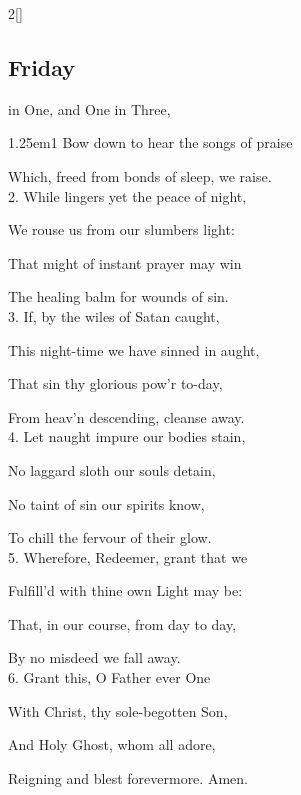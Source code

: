 \begin{paracol}{2}[]
\sloppy

\subsection{Friday}\label{FridayInvitatory}

 in One, and One in Three,


\begin{hangparas}{1.25em}{1}
Bow down to hear the songs of praise

Which, freed from bonds of sleep, we raise.\\

2. While lingers yet the peace of night,

We rouse us from our slumbers light:

That might of instant prayer may win

The healing balm for wounds of sin.\\

3. If, by the wiles of Satan caught,

This night-time we have sinned in aught,

That sin thy glorious pow'r to-day,

From heav'n descending, cleanse away.\\

4. Let naught impure our bodies stain,

No laggard sloth our souls detain,

No taint of sin our spirits know,

To chill the fervour of their glow.\\

5. Wherefore, Redeemer, grant that we

Fulfill'd with thine own Light may be:

That, in our course, from day to day,

By no misdeed we fall away.\\

6. Grant this, O Father ever One

With Christ, thy sole-begotten Son,

And Holy Ghost, whom all adore,

Reigning and blest forevermore. Amen.
\end{hangparas}

\switchcolumn



\end{paracol}
